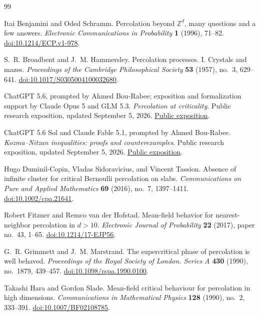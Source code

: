 \documentclass[11pt]{article}
\theoremstyle{definition}
\theoremstyle{remark}
\numberwithin{equation}{section}
\begin{document}
\begin{thebibliography}{99}
\raggedright

Itai Benjamini and Oded Schramm.
Percolation beyond $\mathbb Z^d$, many questions and a few answers.
\emph{Electronic Communications in Probability} \textbf{1} (1996), 71--82.
\href{https://doi.org/10.1214/ECP.v1-978}{doi:10.1214/ECP.v1-978}.

S.~R. Broadbent and J.~M. Hammersley.
Percolation processes. I. Crystals and mazes.
\emph{Proceedings of the Cambridge Philosophical Society}
\textbf{53} (1957), no.~3, 629--641.
\href{https://doi.org/10.1017/S0305004100032680}{doi:10.1017/S0305004100032680}.

ChatGPT 5.6, prompted by Ahmed Bou-Rabee;
exposition and formalization support by Claude Opus 5 and GLM 5.3.
\emph{Percolation at criticality}.
Public research exposition, updated September 5, 2026.
\href{https://nitromannitol.github.io/site-percolation-7d3f2/}{Public exposition}.

ChatGPT 5.6 Sol and Claude Fable 5.1, prompted by Ahmed Bou-Rabee.
\emph{Kozma--Nitzan inequalities: proofs and counterexamples}.
Public research exposition, updated September 5, 2026.
\href{https://nitromannitol.github.io/kn1-verification-b80e9/}{Public exposition}.

Hugo Duminil-Copin, Vladas Sidoravicius, and Vincent Tassion.
Absence of infinite cluster for critical Bernoulli percolation on slabs.
\emph{Communications on Pure and Applied Mathematics}
\textbf{69} (2016), no.~7, 1397--1411.
\href{https://doi.org/10.1002/cpa.21641}{doi:10.1002/cpa.21641}.

Robert Fitzner and Remco van der Hofstad.
Mean-field behavior for nearest-neighbor percolation in $d>10$.
\emph{Electronic Journal of Probability} \textbf{22} (2017), paper no.~43, 1--65.
\href{https://doi.org/10.1214/17-EJP56}{doi:10.1214/17-EJP56}.

G.~R. Grimmett and J.~M. Marstrand.
The supercritical phase of percolation is well behaved.
\emph{Proceedings of the Royal Society of London. Series A}
\textbf{430} (1990), no.~1879, 439--457.
\href{https://doi.org/10.1098/rspa.1990.0100}{doi:10.1098/rspa.1990.0100}.

Takashi Hara and Gordon Slade.
Mean-field critical behaviour for percolation in high dimensions.
\emph{Communications in Mathematical Physics}
\textbf{128} (1990), no.~2, 333--391.
\href{https://doi.org/10.1007/BF02108785}{doi:10.1007/BF02108785}.


\end{thebibliography}
\end{document}

